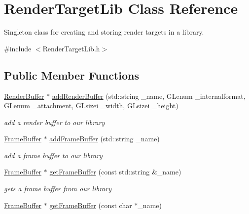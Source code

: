 \hypertarget{class_render_target_lib}{\section{Render\-Target\-Lib Class Reference}
\label{class_render_target_lib}
}


Singleton class for creating and storing render targets in a library.  




{\ttfamily \#include $<$Render\-Target\-Lib.\-h$>$}

\subsection*{Public Member Functions}
\begin{DoxyCompactItemize}
\item 
\hyperlink{class_render_buffer}{Render\-Buffer} $\ast$ \hyperlink{class_render_target_lib_a0ff27ec9ae3c085a2bce4e05c180e0e3}{add\-Render\-Buffer} (std\-::string \-\_\-name, G\-Lenum \-\_\-internalformat, G\-Lenum \-\_\-attachment, G\-Lsizei \-\_\-width, G\-Lsizei \-\_\-height)
\begin{DoxyCompactList}\small\item\em add a render buffer to our library \end{DoxyCompactList}\item 
\hypertarget{class_render_target_lib_ac5971bca0f97cedf1e7c16d8d1233fdc}{\hyperlink{class_frame_buffer}{Frame\-Buffer} $\ast$ \hyperlink{class_render_target_lib_ac5971bca0f97cedf1e7c16d8d1233fdc}{add\-Frame\-Buffer} (std\-::string \-\_\-name)}\label{class_render_target_lib_ac5971bca0f97cedf1e7c16d8d1233fdc}

\begin{DoxyCompactList}\small\item\em add a frame buffer to our library \end{DoxyCompactList}\item 
\hypertarget{class_render_target_lib_a30afc5063831926612da80726dea0f04}{\hyperlink{class_frame_buffer}{Frame\-Buffer} $\ast$ \hyperlink{class_render_target_lib_a30afc5063831926612da80726dea0f04}{get\-Frame\-Buffer} (const std\-::string \&\-\_\-name)}\label{class_render_target_lib_a30afc5063831926612da80726dea0f04}

\begin{DoxyCompactList}\small\item\em gets a frame buffer from our library \end{DoxyCompactList}\item 
\hypertarget{class_render_target_lib_a9695e1a845c84e76c10bec26460b0e8b}{\hyperlink{class_frame_buffer}{Frame\-Buffer} $\ast$ \hyperlink{class_render_target_lib_a9695e1a845c84e76c10bec26460b0e8b}{get\-Frame\-Buffer} (const char $\ast$\-\_\-name)}\label{class_render_target_lib_a9695e1a845c84e76c10bec26460b0e8b}


\end{DoxyCompactItemize}
